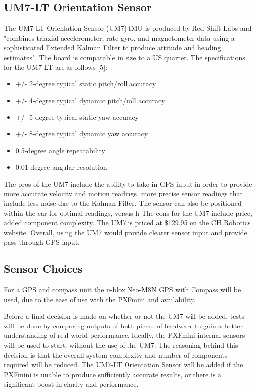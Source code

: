 \documentclass[compsoc,draftclsnofoot,onecolumn,10pt]{IEEEtran}
\begin{document}
\subsection{UM7-LT Orientation Sensor}
The UM7-LT Orientation Sensor (UM7) IMU is produced by Red Shift Labs and "combines triaxial accelerometer, rate gyro, and magnetometer data using a sophisticated Extended Kalman Filter to produce attitude and heading estimates".
The board is comparable in size to a US quarter. 
The specifications for the UM7-LT are as follows [5]:
\begin{itemize}
\item +/- 2-degree typical static pitch/roll accuracy
\item +/- 4-degree typical dynamic pitch/roll accuracy
\item +/- 5-degree typical static yaw accuracy
\item +/- 8-degree typical dynamic yaw accuracy
\item 0.5-degree angle repeatability
\item 0.01-degree angular resolution
\end{itemize}
The pros of the UM7 include the ability to take in GPS input in order to provide more accurate velocity and motion readings, more precise sensor readings that include less noise due to the Kalman Filter. The sensor can also be positioned within the car for optimal readings, versus h
The cons for the UM7 include price, added component complexity. 
The UM7 is priced at \$129.95 on the CH Robotics website. 
Overall, using the UM7 would provide clearer sensor input and provide pass through GPS input. 

\subsection{Sensor Choices}
For a GPS and compass unit the u-blox Neo-M8N GPS with Compass will be used, due to the ease of use with the PXFmini and availability. \par
Before a final decision is made on whether or not the UM7 will be added, tests will be done by comparing outputs of both pieces of hardware to gain a better understanding of real world performance. Ideally, the PXFmini internal sensors will be used to start, without the use of the UM7. The reasoning behind this decision is that the overall system complexity and number of components required will be reduced. The UM7-LT Orientation Sensor will be added if the PXFmini is unable to produce sufficiently accurate results, or there is a significant boost in clarity and performance. 
\end{document}
